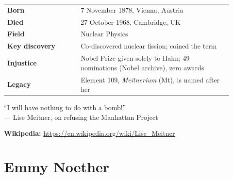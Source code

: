 \documentclass[12pt,a4paper]{article}
\makeatletter
\newcommand{\keyfacts}[1]{%
  \begin{tcolorbox}[factbox, title={Key Facts}]
  \begin{tabular}{@{}p{0.3\linewidth}p{0.62\linewidth}@{}}
  #1
  \end{tabular}
  \end{tcolorbox}
}
\newcommand{\pullquote}[2]{%
  \begin{tcolorbox}[quotebox]
  ``#1''\\[4pt]
  {\small\normalfont\color{medgray}--- #2}
  \end{tcolorbox}
}
\makeatother
\begin{document}
\keyfacts{
\textbf{Born} & 7 November 1878, Vienna, Austria\\[3pt]
\textbf{Died} & 27 October 1968, Cambridge, UK\\[3pt]
\textbf{Field} & Nuclear Physics\\[3pt]
\textbf{Key discovery} & Co-discovered nuclear fission; coined the term\\[3pt]
\textbf{Injustice} & Nobel Prize given solely to Hahn; 49 nominations (Nobel archive), zero awards\\[3pt]
\textbf{Legacy} & Element 109, \textit{Meitnerium} (Mt), is named after her\\
}

\pullquote{I will have nothing to do with a bomb!}{Lise Meitner, on refusing the Manhattan Project}

\textbf{Wikipedia:} \url{https://en.wikipedia.org/wiki/Lise_Meitner}

\newpage

\section{Emmy Noether}
\end{document}
